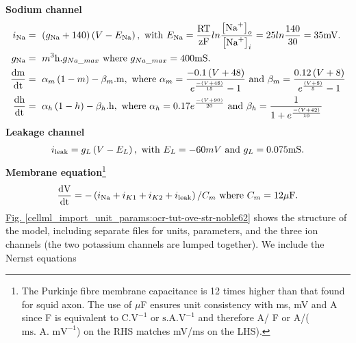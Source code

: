 \documentclass[a4paper,10pt,english]{sphinxmanual}
\begin{document}
\textbf{Sodium channel}
\begin{gather}
\begin{split}i_{\text{Na}} &=\ \left( g_{\text{Na}} + 140 \right)\left( V - E_{\text{Na}} \right), \text{ with } E_{\text{Na}} = \frac{\text{RT}}{\text{zF}}ln\frac{\left\lbrack \text{Na}^{+} \right\rbrack_{o}}{\left\lbrack \text{Na}^{+} \right\rbrack_{i}} = 25ln\frac{140}{30} = 35\text{mV}. \\
g_{\text{Na}} &=\ m^{3}\text{h.}g_{Na\_ max} \text{ where } g_{Na\_ max} = 400\text{mS}. \\
\frac{\text{dm}}{\text{dt}} &=\ \alpha_{m}\left( 1 - m \right) - \beta_{m}\text{.m}, \text{ where } \alpha_{m} = \frac{- 0.1\left( V + 48 \right)}{e^{\frac{- \left( V + 48 \right)}{15}} - 1} \text{ and } \beta_{m} = \frac{0.12\left( V + 8 \right)}{e^{\frac{\left( V + 8 \right)}{5}} - 1} \\
\frac{\text{dh}}{\text{dt}} &=\ \alpha_{h}\left( 1 - h \right) - \beta_{h}\text{.h},
\text{ where } \alpha_{h} = 0.17e^{\frac{- \left( V + 90 \right)}{20}}\text{ and } \beta_{h} = \frac{1}{1 + e^{\frac{- \left( V + 42 \right)}{10}}}\end{split}\notag
\end{gather}
\textbf{Leakage channel}
\begin{gather}
\begin{split}i_{\text{leak}} = g_{L}\left( V - E_{L} \right), \text{ with }
E_{L} = - 60mV \text{ and } g_{L} = 0.075\text{mS}.\end{split}\notag
\end{gather}
\textbf{Membrane equation}\footnote[2]{
The Purkinje fibre membrane capacitance is 12 times higher than that found for squid axon. The use of \(\mu\)F ensures unit consistency with ms, mV and  A since F is equivalent to \(\text{C.V}^{-1}\) or \(\text{s.A.V}^{-1}\) and therefore  A/ F or  A/(\(\text{ms. A. mV}^{-1}\)) on the RHS matches mV/ms on the LHS).
}
\begin{gather}
\begin{split}\frac{\text{dV}}{\text{dt}} = - \left( i_{\text{Na}} + i_{K1} + i_{K2} + i_{\text{leak}} \right)/C_{m}\text{ where } C_{m} = 12\mu\text{F}.\end{split}\notag
\end{gather}
\hyperref[cellml_import_unit_params:ocr-tut-ove-str-noble62]{Fig. \ref{cellml_import_unit_params:ocr-tut-ove-str-noble62}} shows the structure of the model, including separate files for
units, parameters, and the three ion channels (the two potassium
channels are lumped together). We include the Nernst equations
\end{document}
